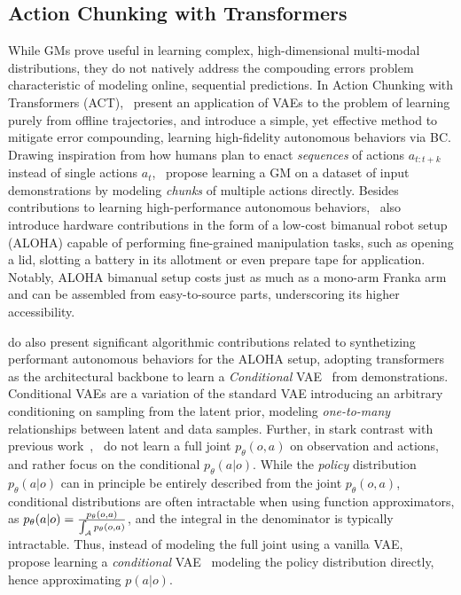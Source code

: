 \subsection{Action Chunking with Transformers}
While GMs prove useful in learning complex, high-dimensional multi-modal distributions, they do not natively address the compouding errors problem characteristic of modeling online, sequential predictions.
In Action Chunking with Transformers (ACT),~\citet{zhaoLearningFineGrainedBimanual2023} present an application of VAEs to the problem of learning purely from offline trajectories, and introduce a simple, yet effective method to mitigate error compounding, learning high-fidelity autonomous behaviors via BC.
Drawing inspiration from how humans plan to enact \emph{sequences} of actions \( a_{t:t+k} \) instead of single actions \( a_t \),~\citet{zhaoLearningFineGrainedBimanual2023} propose learning a GM on a dataset of input demonstrations by modeling \emph{chunks} of multiple actions directly.
Besides contributions to learning high-performance autonomous behaviors,~\citet{zhaoLearningFineGrainedBimanual2023} also introduce hardware contributions in the form of a low-cost bimanual robot setup (ALOHA) capable of performing fine-grained manipulation tasks, such as opening a lid, slotting a battery in its allotment or even prepare tape for application.
Notably, ALOHA bimanual setup costs just as much as a mono-arm Franka arm and can be assembled from easy-to-source parts, underscoring its higher accessibility.

\citet{zhaoLearningFineGrainedBimanual2023} do also present significant algorithmic contributions related to synthetizing performant autonomous behaviors for the ALOHA setup, adopting transformers as the architectural backbone to learn a \emph{Conditional} VAE~\citep{sohnLearningStructuredOutput2015} from demonstrations. 
Conditional VAEs are a variation of the standard VAE  introducing an arbitrary conditioning on sampling from the latent prior, modeling \emph{one-to-many} relationships between latent and data samples.
Further, in stark contrast with previous work~\citep{florenceImplicitBehavioralCloning2022,jannerPlanningDiffusionFlexible2022},~\citet{zhaoLearningFineGrainedBimanual2023} do not learn a full joint \( p_\theta(o,a) \) on observation and actions, and rather focus on the conditional \( p_\theta(a \vert o) \).
While the \emph{policy} distribution \( p_\theta(a \vert o) \) can in principle be entirely described from the joint \( p_\theta(o,a) \), conditional distributions are often intractable when using function approximators, as \( p_\theta(a \vert o) = \tfrac{p_\theta(o,a)}{\int_\mathcal A p_\theta(o,a)} \), and the integral in the denominator is typically intractable.
Thus, instead of modeling the full joint using a vanilla VAE,~\citet{zhaoLearningFineGrainedBimanual2023} propose learning a \emph{conditional} VAE~\citep{sohnLearningStructuredOutput2015} modeling the policy distribution directly, hence approximating \( p (a \vert o) \).


